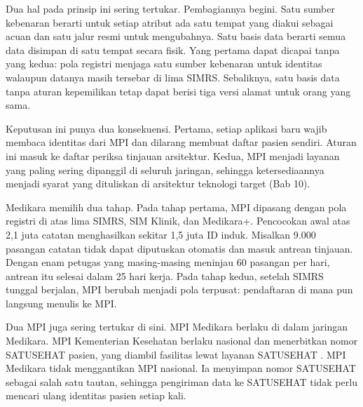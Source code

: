 Dua hal pada prinsip ini sering tertukar. Pembagiannya begini. Satu sumber
kebenaran berarti untuk setiap atribut ada satu tempat yang diakui sebagai
acuan dan satu jalur resmi untuk mengubahnya. Satu basis data berarti semua
data disimpan di satu tempat secara fisik. Yang pertama dapat dicapai tanpa
yang kedua: pola registri menjaga satu sumber kebenaran untuk identitas
walaupun datanya masih tersebar di lima SIMRS. Sebaliknya, satu basis data
tanpa aturan kepemilikan tetap dapat berisi tiga versi alamat untuk orang
yang sama.

Keputusan ini punya dua konsekuensi. Pertama, setiap aplikasi baru wajib
membaca identitas dari MPI dan dilarang membuat daftar pasien sendiri. Aturan
ini masuk ke daftar periksa tinjauan arsitektur. Kedua, MPI menjadi layanan
yang paling sering dipanggil di seluruh jaringan, sehingga ketersediaannya
menjadi syarat yang dituliskan di arsitektur teknologi target (Bab 10).

\begin{kasus}[title={Kasus Medikara Health: Menyatukan Identitas dari Lima Rumah Sakit dan 18 Klinik}]
Medikara memilih dua tahap. Pada tahap pertama, MPI dipasang dengan pola
registri di atas lima SIMRS, SIM Klinik, dan Medikara+. Pencocokan awal atas
2,1 juta catatan menghasilkan sekitar 1,5 juta ID induk. Misalkan 9.000
pasangan catatan tidak dapat diputuskan otomatis dan masuk antrean tinjauan.
Dengan enam petugas yang masing-masing meninjau 60 pasangan per hari, antrean
itu selesai dalam 25 hari kerja. Pada tahap kedua, setelah SIMRS tunggal
berjalan, MPI berubah menjadi pola terpusat: pendaftaran di mana pun langsung
menulis ke MPI.

\medskip
Dua MPI juga sering tertukar di sini. MPI Medikara berlaku di dalam jaringan
Medikara. MPI Kementerian Kesehatan berlaku nasional dan menerbitkan nomor
SATUSEHAT pasien, yang diambil fasilitas lewat layanan SATUSEHAT
\cite{c09-satusehat}. MPI Medikara tidak menggantikan MPI nasional. Ia
menyimpan nomor SATUSEHAT sebagai salah satu tautan, sehingga pengiriman data
ke SATUSEHAT tidak perlu mencari ulang identitas pasien setiap kali.
\end{kasus}

